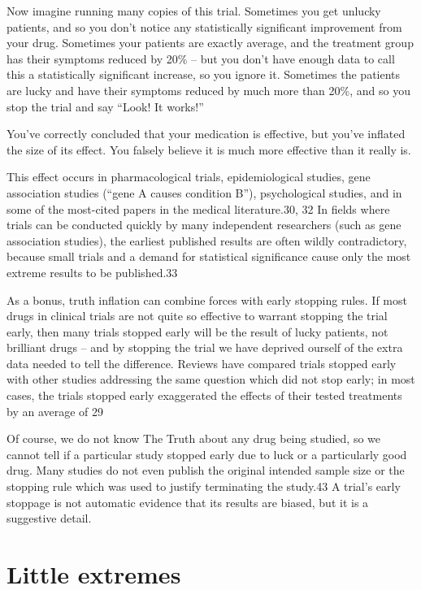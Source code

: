 Now imagine running many copies of this trial. Sometimes you get unlucky patients, and so you don’t notice any statistically significant improvement from your drug. Sometimes your patients are exactly average, and the treatment group has their symptoms reduced by 20\% – but you don’t have enough data to call this a statistically significant increase, so you ignore it. Sometimes the patients are lucky and have their symptoms reduced by much more than 20\%, and so you stop the trial and say “Look! It works!”

You’ve correctly concluded that your medication is effective, but you’ve inflated the size of its effect. You falsely believe it is much more effective than it really is.

This effect occurs in pharmacological trials, epidemiological studies, gene association studies (“gene A causes condition B”), psychological studies, and in some of the most-cited papers in the medical literature.30, 32 In fields where trials can be conducted quickly by many independent researchers (such as gene association studies), the earliest published results are often wildly contradictory, because small trials and a demand for statistical significance cause only the most extreme results to be published.33

As a bonus, truth inflation can combine forces with early stopping rules. If most drugs in clinical trials are not quite so effective to warrant stopping the trial early, then many trials stopped early will be the result of lucky patients, not brilliant drugs – and by stopping the trial we have deprived ourself of the extra data needed to tell the difference. Reviews have compared trials stopped early with other studies addressing the same question which did not stop early; in most cases, the trials stopped early exaggerated the effects of their tested treatments by an average of 29%

Of course, we do not know The Truth about any drug being studied, so we cannot tell if a particular study stopped early due to luck or a particularly good drug. Many studies do not even publish the original intended sample size or the stopping rule which was used to justify terminating the study.43 A trial’s early stoppage is not automatic evidence that its results are biased, but it is a suggestive detail.

\section{Little extremes}
\label{chp7:littleextremes}

